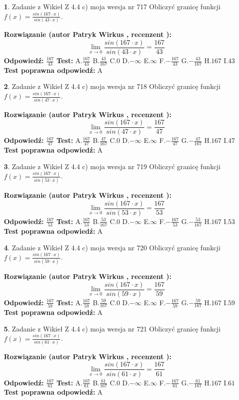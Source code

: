 \documentclass[12pt, a4paper]{article}
\theoremstyle{definition} %
\newtheorem{zad}{}
\newcommand{\zadStart}[1]{\begin{zad}#1\newline}
\newcommand{\zadStop}{\end{zad}}
\newcommand{\rozwStart}[2]{\noindent \textbf{Rozwiązanie (autor #1 , recenzent #2): }\newline}
\newcommand{\rozwStop}{\newline}
\newcommand{\odpStart}{\noindent \textbf{Odpowiedź:}\newline}
\newcommand{\odpStop}{\newline}
\newcommand{\testStart}{\noindent \textbf{Test:}\newline}
\newcommand{\testStop}{\newline}
\newcommand{\kluczStart}{\noindent \textbf{Test poprawna odpowiedź:}\newline}
\newcommand{\kluczStop}{\newline}
\begin{document}
\zadStart{Zadanie z Wikieł Z 4.4 c) moja wersja nr 717}
Obliczyć granicę funkcji $f(x)=\frac{sin(167\cdot x)}{sin(43\cdot x)}$.
\zadStop
\rozwStart{Patryk Wirkus}{}
$$\lim\limits_{x\to 0}\frac{sin(167\cdot x)}{sin(43\cdot x)}=
\frac{167}{43}$$
\rozwStop
\odpStart
$\frac{167}{43}$
\odpStop
\testStart
A.$\frac{167}{43}$
B.$\frac{43}{167}$
C.$0$
D.$-\infty$
E.$\infty$
F.$-\frac{167}{43}$
G.$-\frac{43}{167}$
H.$167$
I.$43$
\testStop
\kluczStart
A
\kluczStop



\zadStart{Zadanie z Wikieł Z 4.4 c) moja wersja nr 718}
Obliczyć granicę funkcji $f(x)=\frac{sin(167\cdot x)}{sin(47\cdot x)}$.
\zadStop
\rozwStart{Patryk Wirkus}{}
$$\lim\limits_{x\to 0}\frac{sin(167\cdot x)}{sin(47\cdot x)}=
\frac{167}{47}$$
\rozwStop
\odpStart
$\frac{167}{47}$
\odpStop
\testStart
A.$\frac{167}{47}$
B.$\frac{47}{167}$
C.$0$
D.$-\infty$
E.$\infty$
F.$-\frac{167}{47}$
G.$-\frac{47}{167}$
H.$167$
I.$47$
\testStop
\kluczStart
A
\kluczStop



\zadStart{Zadanie z Wikieł Z 4.4 c) moja wersja nr 719}
Obliczyć granicę funkcji $f(x)=\frac{sin(167\cdot x)}{sin(53\cdot x)}$.
\zadStop
\rozwStart{Patryk Wirkus}{}
$$\lim\limits_{x\to 0}\frac{sin(167\cdot x)}{sin(53\cdot x)}=
\frac{167}{53}$$
\rozwStop
\odpStart
$\frac{167}{53}$
\odpStop
\testStart
A.$\frac{167}{53}$
B.$\frac{53}{167}$
C.$0$
D.$-\infty$
E.$\infty$
F.$-\frac{167}{53}$
G.$-\frac{53}{167}$
H.$167$
I.$53$
\testStop
\kluczStart
A
\kluczStop



\zadStart{Zadanie z Wikieł Z 4.4 c) moja wersja nr 720}
Obliczyć granicę funkcji $f(x)=\frac{sin(167\cdot x)}{sin(59\cdot x)}$.
\zadStop
\rozwStart{Patryk Wirkus}{}
$$\lim\limits_{x\to 0}\frac{sin(167\cdot x)}{sin(59\cdot x)}=
\frac{167}{59}$$
\rozwStop
\odpStart
$\frac{167}{59}$
\odpStop
\testStart
A.$\frac{167}{59}$
B.$\frac{59}{167}$
C.$0$
D.$-\infty$
E.$\infty$
F.$-\frac{167}{59}$
G.$-\frac{59}{167}$
H.$167$
I.$59$
\testStop
\kluczStart
A
\kluczStop



\zadStart{Zadanie z Wikieł Z 4.4 c) moja wersja nr 721}
Obliczyć granicę funkcji $f(x)=\frac{sin(167\cdot x)}{sin(61\cdot x)}$.
\zadStop
\rozwStart{Patryk Wirkus}{}
$$\lim\limits_{x\to 0}\frac{sin(167\cdot x)}{sin(61\cdot x)}=
\frac{167}{61}$$
\rozwStop
\odpStart
$\frac{167}{61}$
\odpStop
\testStart
A.$\frac{167}{61}$
B.$\frac{61}{167}$
C.$0$
D.$-\infty$
E.$\infty$
F.$-\frac{167}{61}$
G.$-\frac{61}{167}$
H.$167$
I.$61$
\testStop
\kluczStart
A
\kluczStop
\end{document}
